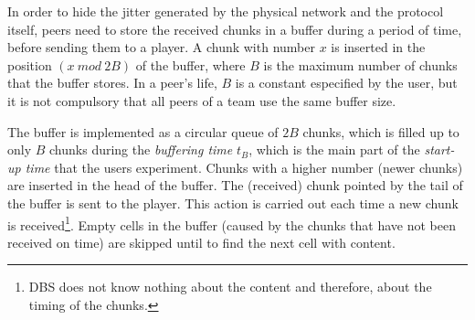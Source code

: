 

\label{sec:buffering_chunks}

In order to hide the jitter generated by the physical network and the
protocol itself, peers need to store the received chunks in a buffer
during a period of time, before sending them to a player. A chunk with
number $x$ is inserted in the position $(x~\mathit{mod}~2B)$ of the
buffer, where $B$ is the maximum number of chunks that the buffer
stores. In a peer's life, $B$ is a constant especified by the user,
but it is not compulsory that all peers of a team use the same buffer
size.

The buffer is implemented as a circular queue of $2B$ chunks, which is
filled up to only $B$ chunks during the \emph{buffering time} $t_B$,
which is the main part of the \emph{start-up time} that the users
experiment. Chunks with a higher number (newer chunks) are inserted in
the head of the buffer. The (received) chunk pointed by the tail of
the buffer is sent to the player. This action is carried out each time
a new chunk is received\footnote{DBS does not know nothing about the
  content and therefore, about the timing of the chunks.}. Empty cells
in the buffer (caused by the chunks that have not been received on
time) are skipped until to find the next cell with content.

